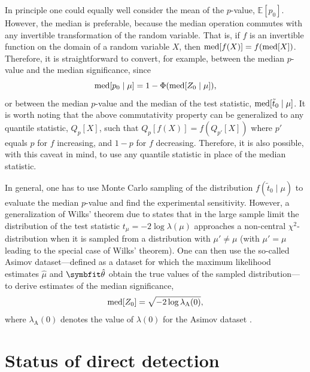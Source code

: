 In principle one could equally well consider the mean of the $p$-value, $\mathbb{E}[p_0]$. However, the median is preferable, because the median operation commutes with any invertible transformation of the random variable. That is, if $f$ is an invertible function on the domain of a random variable $X$, then $\operatorname{med}[f(X)]=f(\operatorname{med}[X])$. Therefore, it is straightforward to convert, for example, between the median $p$-value and the median significance, since
\begin{equation}
    \operatorname{med}[p_0\mid\mu]=1-\Phi(\operatorname{med}[Z_0\mid\mu]),
\end{equation}
or between the median $p$-value and the median of the test statistic, $\operatorname{med}[\tilde{t}_0\mid\mu]$. It is worth noting that the above commutativity property can be generalized to any quantile statistic, $Q_p[X]$, such that $Q_p[f(X)]=f(Q_{p'}[X])$ where $p'$ equals $p$ for $f$ increasing, and $1-p$ for $f$ decreasing. Therefore, it is also possible, with this caveat in mind, to use any quantile statistic in place of the median statistic.

In general, one has to use Monte Carlo sampling of the distribution $f(\tilde{t}_0\mid\mu)$ to evaluate the median $p$-value and find the experimental sensitivity. However, a generalization of Wilks' theorem due to \textcite{Wald1943} states that in the large sample limit the distribution of the test statistic $t_\mu=-2\log\lambda(\mu)$ approaches a non-central $\chi^2$-distribution when it is sampled from a distribution with $\mu'\neq\mu$ (with $\mu'=\mu$ leading to the special case of Wilks' theorem). One can then use the so-called Asimov dataset---defined as a dataset for which the maximum likelihood estimates $\hat{\mu}$ and $\unitv{\theta}$ obtain the true values of the sampled distribution---to derive estimates of the median significance,
\begin{equation}
\operatorname{med}[Z_0]=\sqrt{-2\log\lambda_\text{A}(0)},
\end{equation}where $\lambda_\text{A}(0)$ denotes the value of $\lambda(0)$ for the Asimov dataset \parencite{CowanEtAl2011}.

\section{Status of direct detection}

